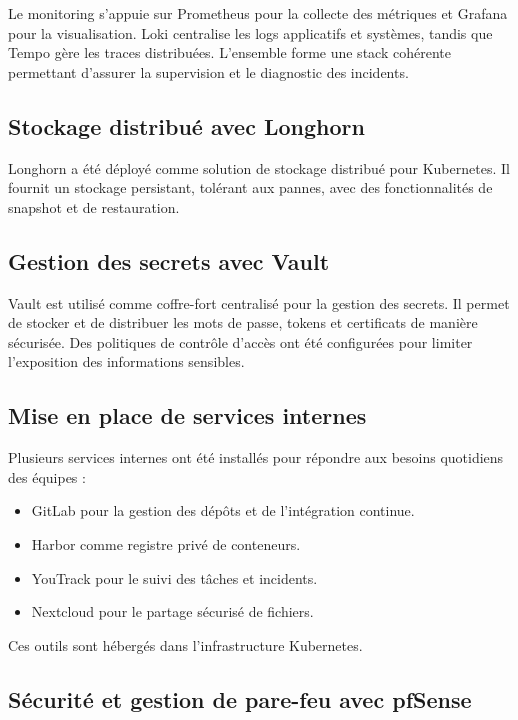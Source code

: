 Le monitoring s’appuie sur Prometheus pour la collecte des métriques et Grafana pour la visualisation. Loki centralise les logs applicatifs et systèmes, tandis que Tempo gère les traces distribuées. L’ensemble forme une stack cohérente permettant d’assurer la supervision et le diagnostic des incidents.

\subsection{Stockage distribué avec Longhorn}

Longhorn a été déployé comme solution de stockage distribué pour Kubernetes. Il fournit un stockage persistant, tolérant aux pannes, avec des fonctionnalités de snapshot et de restauration.

\subsection{Gestion des secrets avec Vault}

Vault est utilisé comme coffre-fort centralisé pour la gestion des secrets. Il permet de stocker et de distribuer les mots de passe, tokens et certificats de manière sécurisée. Des politiques de contrôle d’accès ont été configurées pour limiter l’exposition des informations sensibles.

\subsection{Mise en place de services internes}

Plusieurs services internes ont été installés pour répondre aux besoins quotidiens des équipes :

\begin{itemize}
	\item GitLab pour la gestion des dépôts et de l’intégration continue.
	\item Harbor comme registre privé de conteneurs.
	\item YouTrack pour le suivi des tâches et incidents.
	\item Nextcloud pour le partage sécurisé de fichiers.
\end{itemize}

Ces outils sont hébergés dans l’infrastructure Kubernetes.

\subsection{Sécurité et gestion de pare-feu avec pfSense}


